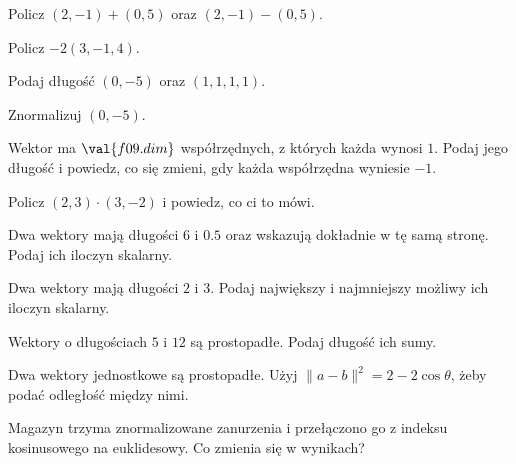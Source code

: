 \begin{testexercises}
\item Policz $(2, -1) + (0, 5)$ oraz $(2, -1) - (0, 5)$.
\item Policz $-2(3, -1, 4)$.
\item Podaj długość $(0, -5)$ oraz $(1, 1, 1, 1)$.
\item Znormalizuj $(0, -5)$.
\item Wektor ma $\val{f09.dim}$ współrzędnych, z których każda wynosi $1$.
  Podaj jego długość i powiedz, co się zmieni, gdy każda współrzędna wyniesie
  $-1$.
\item Policz $(2, 3) \cdot (3, -2)$ i powiedz, co ci to mówi.
\item Dwa wektory mają długości $6$ i $\num{0.5}$ oraz wskazują dokładnie w tę
  samą stronę. Podaj ich iloczyn skalarny.
\item Dwa wektory mają długości $2$ i $3$. Podaj największy i najmniejszy
  możliwy ich iloczyn skalarny.
\item Wektory o długościach $5$ i $12$ są prostopadłe. Podaj długość ich sumy.
\item Dwa wektory jednostkowe są prostopadłe. Użyj
  $\lVert a - b \rVert^{2} = 2 - 2\cos\theta$, żeby podać odległość między
  nimi.
\item Magazyn trzyma znormalizowane zanurzenia i przełączono go z indeksu
  kosinusowego na euklidesowy. Co zmienia się w wynikach?

\end{testexercises}
